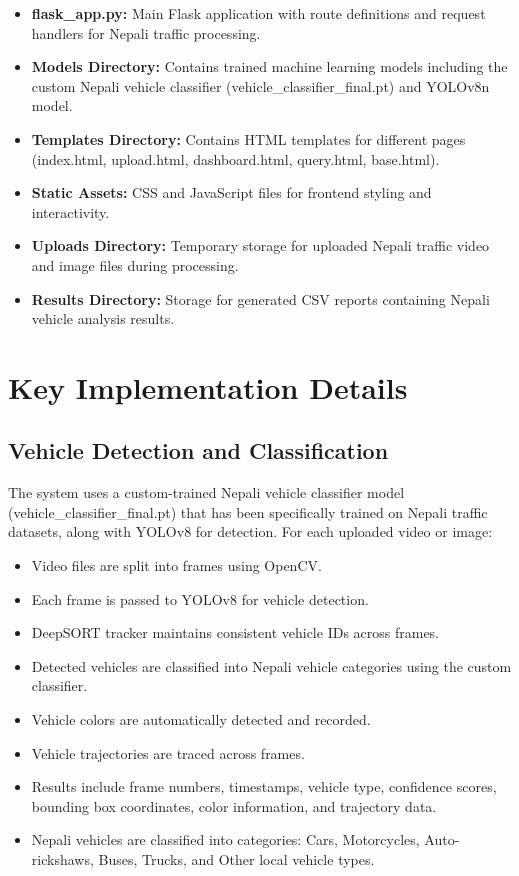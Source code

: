 \documentclass[12pt,a4paper]{report}
\begin{document}
\begin{itemize}
    \item \textbf{flask\_app.py:} Main Flask application with route definitions and request handlers for Nepali traffic processing.
    \item \textbf{Models Directory:} Contains trained machine learning models including the custom Nepali vehicle classifier (vehicle\_classifier\_final.pt) and YOLOv8n model.
    \item \textbf{Templates Directory:} Contains HTML templates for different pages (index.html, upload.html, dashboard.html, query.html, base.html).
    \item \textbf{Static Assets:} CSS and JavaScript files for frontend styling and interactivity.
    \item \textbf{Uploads Directory:} Temporary storage for uploaded Nepali traffic video and image files during processing.
    \item \textbf{Results Directory:} Storage for generated CSV reports containing Nepali vehicle analysis results.
\end{itemize}

\section{Key Implementation Details}

\subsection{Vehicle Detection and Classification}
The system uses a custom-trained Nepali vehicle classifier model (vehicle\_classifier\_final.pt) that has been specifically trained on Nepali traffic datasets, along with YOLOv8 for detection. For each uploaded video or image:
\begin{itemize}
    \item Video files are split into frames using OpenCV.
    \item Each frame is passed to YOLOv8 for vehicle detection.
    \item DeepSORT tracker maintains consistent vehicle IDs across frames.
    \item Detected vehicles are classified into Nepali vehicle categories using the custom classifier.
    \item Vehicle colors are automatically detected and recorded.
    \item Vehicle trajectories are traced across frames.
    \item Results include frame numbers, timestamps, vehicle type, confidence scores, bounding box coordinates, color information, and trajectory data.
    \item Nepali vehicles are classified into categories: Cars, Motorcycles, Auto-rickshaws, Buses, Trucks, and Other local vehicle types.
\end{itemize}
\end{document}
